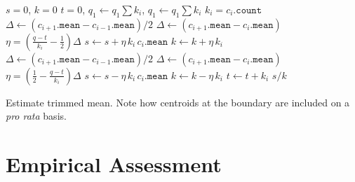 \documentclass[11pt]{amsart}
\begin{document}
 \begin{algorithm}[b]
 \label{alg:estimate-trimmed-mean}
\SetNoFillComment
{}
$s = 0$, $k = 0$\;
$t = 0$, $q_1 \gets q_1 \sum k_i$, $q_1 \gets q_1 \sum k_i$\;
 {
  $k_i = c_i.\mathtt{count}$\;
   {
     {
      $\Delta \gets (c_{i+1}.\mathtt{mean} - c_{i-1}.\mathtt{mean})/2$\;
    }  {
      $\Delta \gets (c_{i+1}.\mathtt{mean} - c_i.\mathtt{mean})$\;
    } 
    $\eta = \left( \frac {q-t} {k_i} - \frac 1 2 \right) \Delta$\;
    $s \gets s + \eta \,k_i \,c_i.\mathtt{mean}$\;
    $k \gets k + \eta \,k_i$\;
  } 
   {
     {
      $\Delta \gets (c_{i+1}.\mathtt{mean} - c_{i-1}.\mathtt{mean})/2$\;
    }  {
      $\Delta \gets (c_{i+1}.\mathtt{mean} - c_i.\mathtt{mean})$\;
    } 
    $\eta = \left(\frac 1 2 - \frac {q-t} { k_i}  \right) \Delta$\;
    $s \gets s - \eta \,k_i \,c_i.\mathtt{mean}$\;
    $k \gets k - \eta \,k_i$\;
  } 
  $t \gets t + k_i$
}
\Return $s/k$
\caption{Estimate trimmed mean.  Note how centroids at the boundary are included on a {\em pro rata} basis.}
\end{algorithm}
\section{Empirical Assessment}
\end{document}

